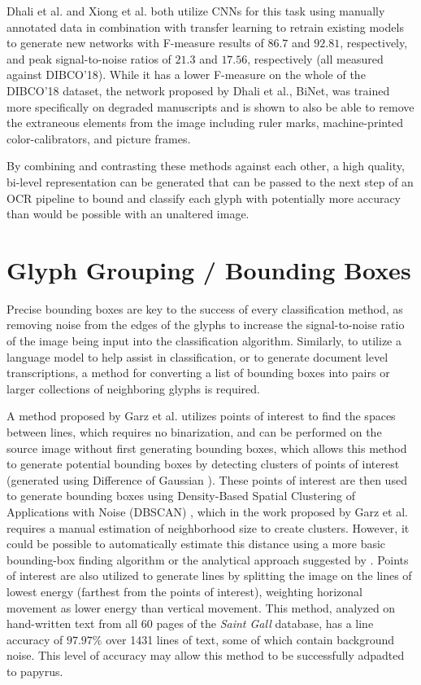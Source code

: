Dhali et al.\cite{Dhali2019} and Xiong et al.\cite{Xiong} both utilize CNNs for this task using manually annotated data in combination with transfer learning to retrain existing models to generate new networks with F-measure results of $86.7$ and $92.81$, respectively, and peak signal-to-noise ratios of $21.3$ and $17.56$, respectively (all measured against DIBCO'18). While it has a lower F-measure on the whole of the DIBCO'18 dataset, the network proposed by Dhali et al., BiNet, was trained more specifically on degraded manuscripts and is shown to also be able to remove the extraneous elements from the image including ruler marks, machine-printed color-calibrators, and picture frames.

By combining and contrasting these methods against each other, a high quality, bi-level representation can be generated that can be passed to the next step of an OCR pipeline to bound and classify each glyph with potentially more accuracy than would be possible with an unaltered image.

\section{Glyph Grouping / Bounding Boxes}
Precise bounding boxes are key to the success of every classification method, as removing noise from the edges of the glyphs to increase the signal-to-noise ratio of the image being input into the classification algorithm. Similarly, to utilize a language model to help assist in classification, or to generate document level transcriptions, a method for converting a list of bounding boxes into pairs or larger collections of neighboring glyphs is required.

A method proposed by Garz et al.\cite{Garz2012, Garz2011} utilizes points of interest to find the spaces between lines, which requires no binarization, and can be performed on the source image without first generating bounding boxes, which allows this method to generate potential bounding boxes by detecting clusters of points of interest (generated using Difference of Gaussian \cite{Lowe}). These points of interest are then used to generate bounding boxes using Density-Based Spatial Clustering of Applications with Noise (DBSCAN) \cite{Ester}, which in the work proposed by Garz et al.\cite{Garz2012, Garz2011} requires a manual estimation of neighborhood size to create clusters. However, it could be possible to automatically estimate this distance using a more basic bounding-box finding algorithm or the analytical approach suggested by \cite{Daszykowski}. Points of interest are also utilized to generate lines by splitting the image on the lines of lowest energy (farthest from the points of interest), weighting horizonal movement as lower energy than vertical movement.
This method, analyzed on hand-written text from all 60 pages of the \textit{Saint Gall} database, has a line accuracy of $97.97\%$ over 1431 lines of text, some of which contain background noise. This level of accuracy may allow this method to be successfully adpadted to papyrus.

